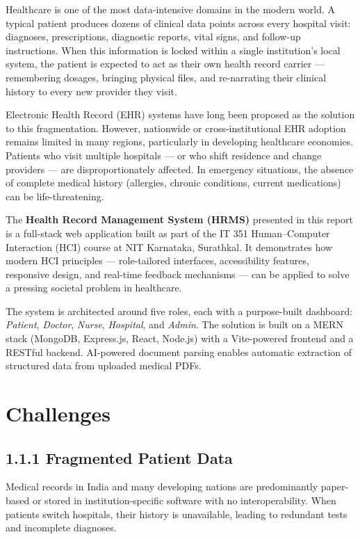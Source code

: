\documentclass[12pt,a4paper]{report}
\begin{document}
Healthcare is one of the most data-intensive domains in the modern world. A typical patient produces dozens of clinical data points across every hospital visit: diagnoses, prescriptions, diagnostic reports, vital signs, and follow-up instructions. When this information is locked within a single institution's local system, the patient is expected to act as their own health record carrier — remembering dosages, bringing physical files, and re-narrating their clinical history to every new provider they visit.

Electronic Health Record (EHR) systems have long been proposed as the solution to this fragmentation. However, nationwide or cross-institutional EHR adoption remains limited in many regions, particularly in developing healthcare economies. Patients who visit multiple hospitals — or who shift residence and change providers — are disproportionately affected. In emergency situations, the absence of complete medical history (allergies, chronic conditions, current medications) can be life-threatening.

The \textbf{Health Record Management System (HRMS)} presented in this report is a full-stack web application built as part of the IT 351 Human--Computer Interaction (HCI) course at NIT Karnataka, Surathkal. It demonstrates how modern HCI principles — role-tailored interfaces, accessibility features, responsive design, and real-time feedback mechanisms — can be applied to solve a pressing societal problem in healthcare.

The system is architected around five roles, each with a purpose-built dashboard: \textit{Patient}, \textit{Doctor}, \textit{Nurse}, \textit{Hospital}, and \textit{Admin}. The solution is built on a MERN stack (MongoDB, Express.js, React, Node.js) with a Vite-powered frontend and a RESTful backend. AI-powered document parsing enables automatic extraction of structured data from uploaded medical PDFs.

\section{Challenges}

\subsection{1.1.1 Fragmented Patient Data}
Medical records in India and many developing nations are predominantly paper-based or stored in institution-specific software with no interoperability. When patients switch hospitals, their history is unavailable, leading to redundant tests and incomplete diagnoses.
\end{document}
